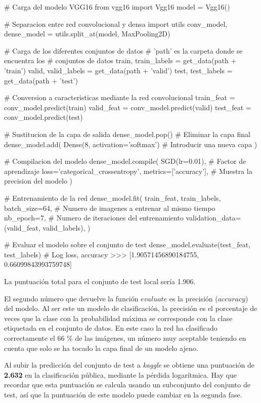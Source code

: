 \begin{python}
# Carga del modelo VGG16
from vgg16 import Vgg16
model = Vgg16()

# Separacion entre red convolucional y densa
import utils
conv_model, dense_model = utils.split_at(model, MaxPooling2D)

# Carga de los diferentes conjuntos de datos
#  'path' es la carpeta donde se encuentra los
#  conjuntos de datos
train, train_labels = get_data(path + 'train')
valid, valid_labels = get_data(path + 'valid')
test, test_labels = get_data(path + 'test')

# Conversion a caracteristicas mediante la red convolucional
train_feat = conv_model.predict(train)
valid_feat = conv_model.predict(valid)
test_feat = conv_model.predict(test)

# Sustitucion de la capa de salida
dense_model.pop()  # Eliminar la capa final
dense_model.add(
    Dense(8, activation='softmax')  # Introducir una nueva capa
)

# Compilacion del modelo
dense_model.compile(
    SGD(lr=0.01),  # Factor de aprendizaje
    loss='categorical_crossentropy',
    metrics=['accuracy'],  # Muestra la precision del modelo
)

# Entrenamiento de la red
dense_model.fit(
    train_feat,
    train_labels,
    batch_size=64,  # Numero de imagenes a entrenar al mismo tiempo
    nb_epoch=7,     # Numero de iteraciones del entrenamiento
    validation_data=(valid_feat, valid_labels),
)

# Evaluar el modelo sobre el conjunto de test
dense_model.evaluate(test_feat, test_labels)
# Log loss, accuracy
>>> [1.90571456890184755, 0.66099843993759748]
\end{python}

La puntuación total para el conjunto de test local sería 1.906. 

El segundo número que devuelve la función $evaluate$ es la precisión
($accuracy$) del modelo. Al ser este un modelo de clasificación, la precisión
es el porcentaje de veces que la clase con la probabilidad máxima se
corresponde con la clase etiquetada en el conjunto de datos. En este caso la
red ha clasificado correctamente el 66 \% de las imágenes, un número muy
aceptable teniendo en cuenta que solo se ha tocado la capa final de un modelo
ajeno.

Al subir la predicción del conjunto de test a \textit{kaggle} se obtiene una
puntuación de \textbf{2.632} en la clasificación pública, mediante la pérdida
logarítmica. Hay que recordar que esta puntuación se calcula usando un
subconjunto del conjunto de test, así que la puntuación de este modelo puede
cambiar en la segunda fase.

